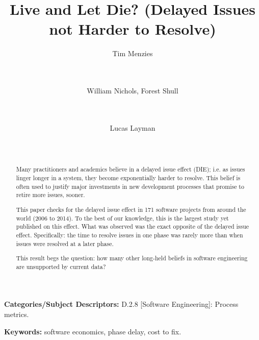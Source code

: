 \documentclass{sig-alternate}
\begin{document}
\title{Live and Let Die? (Delayed Issues   not  Harder to Resolve)}
\author{
Tim Menzies \\
       \\
       \\
\and%
William Nichols, Forest Shull \\
        \\
        \\
\and %
Lucas Layman \\
        \\
       \\ 
} 
\maketitle
\begin{abstract}
Many  practitioners and academics
believe in a delayed issue effect (DIE); i.e.
 as issues linger longer in a system,
 they become exponentially harder to resolve.
This belief
is often  used to justify 
major investments in  new development
processes that promise to retire more issues, sooner.

This paper checks for the delayed issue effect in
171 software projects from around the world (2006 to 2014).
To the best of our knowledge,  this is the largest study
yet published on this effect.
What was observed was the  exact
opposite of the  delayed issue effect. Specifically:
the  time  to resolve 
issues  in one phase  was rarely more than when  issues
were resolved at a later phase. 

This  result begs the question: how many other long-held
beliefs in software engineering are
unsupported by current data? 
\end{abstract}

\vspace{1mm}
\noindent
{\bf Categories/Subject Descriptors:} 
D.2.8 [Software Engineering]: Process metrics.

 

\vspace{1mm}
\noindent
{\bf Keywords:} software economics, phase delay, cost to fix.
 
\end{document}
